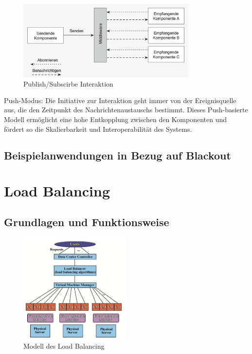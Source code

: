 \documentclass[a4paper,12pt]{article}
\let\stdsection\section
\renewcommand\section{\newpage\stdsection}
\begin{document}
\begin{figure}[h]
    \centering
    \includegraphics[width=0.8\textwidth]{images/Publish_Subscirbe.png}
    \caption{Publish/Subscirbe Interaktion \cite[S. 54]{Bruns2010}}
    \label{fig:PubSub}
\end{figure}
Push-Modus: Die Initiative zur Interaktion geht immer von der Ereignisquelle aus, die den Zeitpunkt des Nachrichtenaustauschs bestimmt. Dieses Push-basierte Modell ermöglicht eine hohe Entkopplung zwischen den Komponenten und fördert so die Skalierbarkeit und Interoperabilität des Systems.
\subsection{Beispielanwendungen in Bezug auf Blackout}
 \cite{example2023}

\section{Load Balancing}
\subsection{Grundlagen und Funktionsweise}

\begin{figure}[h]
    \centering
    \includegraphics[width=0.5\textwidth]{images/Load_Balancing.png}
    \caption{Modell des Load Balancing}
    \label{fig:LoadBalancing}
\end{figure}
\end{document}
